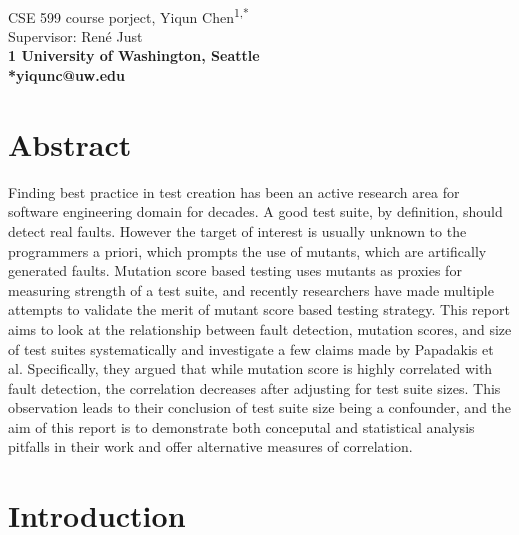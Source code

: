 \documentclass[10pt,letterpaper]{article}
\begin{document}
\vspace*{0.35in}

\begin{flushleft}
{\Large
\textbf{}
}
\newline
\\
CSE 599 course porject, Yiqun Chen\textsuperscript{1,*}\\
Supervisor: Ren\'e Just \\

\bigskip
\bf{1} University of Washington, Seattle
\\
\bigskip
*yiqunc@uw.edu
\end{flushleft}



\section*{Abstract}
Finding best practice in test creation has been an active research area for software engineering domain for decades. A good test suite, by definition, should detect real faults. However the target of interest is usually unknown to the programmers a priori, which prompts the use of mutants, which are artifically generated faults. Mutation score based testing uses mutants as proxies for measuring strength of a test suite, and recently researchers have made multiple attempts to validate the merit of mutant score based testing strategy. This report aims to look at the relationship between fault detection, mutation scores, and size of test suites systematically and investigate a few claims made by Papadakis et al. Specifically, they argued that while mutation score is highly correlated with fault detection, the correlation decreases after adjusting for test suite sizes. This observation leads to their conclusion of test suite size being a confounder, and the aim of this report is to demonstrate both conceputal and statistical analysis pitfalls in their work and offer alternative measures of correlation.




\section{Introduction}
\end{document}
